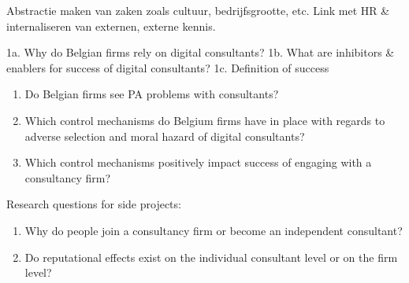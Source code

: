 \documentclass[12pt]{article}
\providecommand{\tightlist}{%
  \setlength{\itemsep}{0pt}\setlength{\parskip}{0pt}}
\begin{document}
Abstractie maken van zaken zoals cultuur, bedrijfsgrootte, etc. Link met
HR \& internaliseren van externen, externe kennis.

1a. Why do Belgian firms rely on digital consultants? 1b. What are
inhibitors \& enablers for success of digital consultants? 1c.
Definition of success

\begin{enumerate}
\def\labelenumi{\arabic{enumi}.}
\setcounter{enumi}{1}
\tightlist
\item
  Do Belgian firms see PA problems with consultants?
\item
  Which control mechanisms do Belgium firms have in place with regards
  to adverse selection and moral hazard of digital consultants?
\item
  Which control mechanisms positively impact success of engaging with a
  consultancy firm?
\end{enumerate}

Research questions for side projects:

\begin{enumerate}
\def\labelenumi{\arabic{enumi}.}
\tightlist
\item
  Why do people join a consultancy firm or become an independent
  consultant?
\item
  Do reputational effects exist on the individual consultant level or on
  the firm level?
\end{enumerate}



\end{document}
